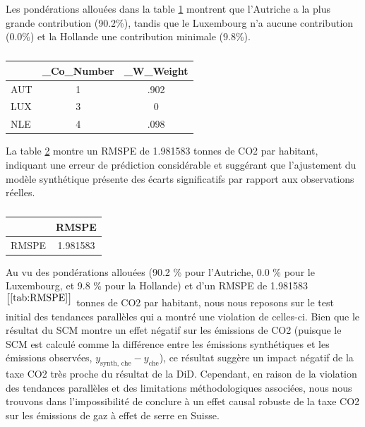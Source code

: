 Les pondérations allouées dans la table \ref{tab:unit_weights} montrent que l'Autriche a la plus grande contribution (90.2\%), tandis que le Luxembourg n'a aucune contribution (0.0\%) et la Hollande une contribution minimale (9.8\%).

\begin{table}[ht]
\centering
\footnotesize{
\begin{tabular}{|l|*{2}{c}|}
\hline
            &  \_Co\_Number &   \_W\_Weight\\
\hline
AUT         &           1   &        .902\\
LUX         &           3   &           0\\
NLE         &           4   &        .098\\
\hline
\end{tabular}
}
\caption{}
\label{tab:unit_weights}
\end{table}

La table \ref{tab:RMSPE} montre un RMSPE de 1.981583 tonnes de CO2 par habitant, indiquant une erreur de prédiction considérable et suggérant que l'ajustement du modèle synthétique présente des écarts significatifs par rapport aux observations réelles.

\begin{table}[ht]
\centering
\footnotesize{
\begin{tabular}{|l|*{1}{c|}}
\hline
            &       RMSPE\\
\hline
RMSPE       &    1.981583\\
\hline
\end{tabular}
}
\caption{}
\label{tab:RMSPE}
\end{table}

Au vu des pondérations allouées (90.2 \% pour l'Autriche, 0.0 \% pour le Luxembourg, et 9.8 \% pour la Hollande) et d'un RMSPE de 1.981583$^{\left[\ref{tab:RMSPE}\right]}$  tonnes de CO2 par habitant, nous nous reposons sur le test initial des tendances parallèles qui a montré une violation de celles-ci. Bien que le résultat du SCM montre un effet négatif sur les émissions de CO2 (puisque le SCM est calculé comme la différence entre les émissions synthétiques et les émissions observées, \( y_{\text{synth, che}} - y_{\text{che}} \)), ce résultat suggère un impact négatif de la taxe CO2 très proche du résultat de la DiD. Cependant, en raison de la violation des tendances parallèles et des limitations méthodologiques associées, nous nous trouvons dans l'impossibilité de conclure à un effet causal robuste de la taxe CO2 sur les émissions de gaz à effet de serre en Suisse.


